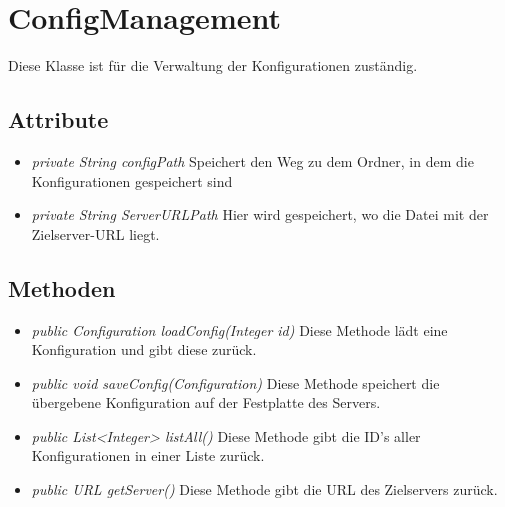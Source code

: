 
\section{ConfigManagement}
Diese Klasse ist für die Verwaltung der Konfigurationen zuständig.
\subsection{Attribute}
\begin{itemize}
	\item \textit{private String configPath} Speichert den Weg zu dem Ordner, in dem die Konfigurationen gespeichert sind
	
	\item \textit{private String ServerURLPath} Hier wird gespeichert, wo die Datei mit der Zielserver-URL liegt.		
\end{itemize}

\subsection{Methoden}
\begin{itemize}
	\item \textit{public Configuration loadConfig(Integer id)} Diese Methode lädt eine Konfiguration und gibt diese zurück.
	
	\item \textit{public void saveConfig(Configuration)} Diese Methode speichert die übergebene Konfiguration auf der Festplatte des Servers.
	
	\item \textit{public List<Integer> listAll()} Diese Methode gibt die ID's aller Konfigurationen in einer Liste zurück.
	
	\item \textit{public URL getServer()} Diese Methode gibt die URL des Zielservers zurück.
\end{itemize}